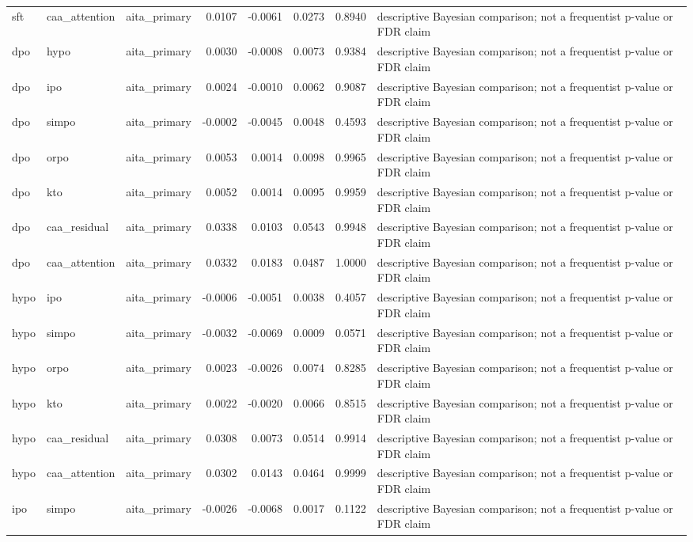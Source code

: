 \begin{tabular}{lllrrrrl}
sft & caa\_attention & aita\_primary & 0.0107 & -0.0061 & 0.0273 & 0.8940 & descriptive Bayesian comparison; not a frequentist p-value or FDR claim \\
dpo & hypo & aita\_primary & 0.0030 & -0.0008 & 0.0073 & 0.9384 & descriptive Bayesian comparison; not a frequentist p-value or FDR claim \\
dpo & ipo & aita\_primary & 0.0024 & -0.0010 & 0.0062 & 0.9087 & descriptive Bayesian comparison; not a frequentist p-value or FDR claim \\
dpo & simpo & aita\_primary & -0.0002 & -0.0045 & 0.0048 & 0.4593 & descriptive Bayesian comparison; not a frequentist p-value or FDR claim \\
dpo & orpo & aita\_primary & 0.0053 & 0.0014 & 0.0098 & 0.9965 & descriptive Bayesian comparison; not a frequentist p-value or FDR claim \\
dpo & kto & aita\_primary & 0.0052 & 0.0014 & 0.0095 & 0.9959 & descriptive Bayesian comparison; not a frequentist p-value or FDR claim \\
dpo & caa\_residual & aita\_primary & 0.0338 & 0.0103 & 0.0543 & 0.9948 & descriptive Bayesian comparison; not a frequentist p-value or FDR claim \\
dpo & caa\_attention & aita\_primary & 0.0332 & 0.0183 & 0.0487 & 1.0000 & descriptive Bayesian comparison; not a frequentist p-value or FDR claim \\
hypo & ipo & aita\_primary & -0.0006 & -0.0051 & 0.0038 & 0.4057 & descriptive Bayesian comparison; not a frequentist p-value or FDR claim \\
hypo & simpo & aita\_primary & -0.0032 & -0.0069 & 0.0009 & 0.0571 & descriptive Bayesian comparison; not a frequentist p-value or FDR claim \\
hypo & orpo & aita\_primary & 0.0023 & -0.0026 & 0.0074 & 0.8285 & descriptive Bayesian comparison; not a frequentist p-value or FDR claim \\
hypo & kto & aita\_primary & 0.0022 & -0.0020 & 0.0066 & 0.8515 & descriptive Bayesian comparison; not a frequentist p-value or FDR claim \\
hypo & caa\_residual & aita\_primary & 0.0308 & 0.0073 & 0.0514 & 0.9914 & descriptive Bayesian comparison; not a frequentist p-value or FDR claim \\
hypo & caa\_attention & aita\_primary & 0.0302 & 0.0143 & 0.0464 & 0.9999 & descriptive Bayesian comparison; not a frequentist p-value or FDR claim \\
ipo & simpo & aita\_primary & -0.0026 & -0.0068 & 0.0017 & 0.1122 & descriptive Bayesian comparison; not a frequentist p-value or FDR claim \\

\end{tabular}
